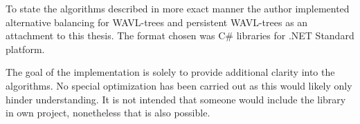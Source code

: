 To state the algorithms described in more exact manner the author implemented alternative balancing for WAVL-trees and persistent WAVL-trees as an attachment to this thesis. The format chosen was C\# libraries for .NET Standard platform.


The goal of the implementation is solely to provide additional clarity into the algorithms. No special optimization has been carried out as this would likely only hinder understanding. It is not intended that someone would include the library in own project, nonetheless that is also possible.